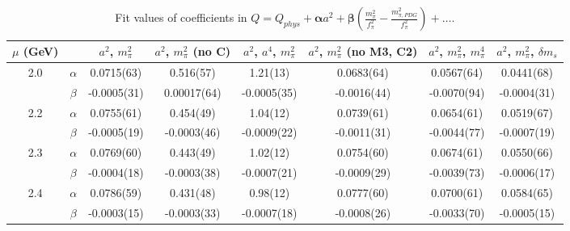 \documentclass[12pt]{extarticle}
\begin{document}
\begin{table}[h!]
\begin{center}
\begin{tabular}{|c c|c|c|c|c|c|c|}
\hline
$\mu$ (GeV) &  & $a^2$, $m_\pi^2$& $a^2$, $m_\pi^2$ (no C)& $a^2$, $a^4$, $m_\pi^2$& $a^2$, $m_\pi^2$ (no M3, C2)& $a^2$, $m_\pi^2$, $m_\pi^4$& $a^2$, $m_\pi^2$, $\delta m_s$\\
\hline
\multirow{2}{0.5in}{2.0} & $\alpha$ & 0.0715(63)& 0.516(57)& 1.21(13)& 0.0683(64)& 0.0567(64)& 0.0441(68)\\
 & $\beta$ & -0.0005(31)& 0.00017(64)& -0.0005(35)& -0.0016(44)& -0.0070(94)& -0.0004(31)\\
\hline
\multirow{2}{0.5in}{2.2} & $\alpha$ & 0.0755(61)& 0.454(49)& 1.04(12)& 0.0739(61)& 0.0654(61)& 0.0519(67)\\
 & $\beta$ & -0.0005(19)& -0.0003(46)& -0.0009(22)& -0.0011(31)& -0.0044(77)& -0.0007(19)\\
\hline
\multirow{2}{0.5in}{2.3} & $\alpha$ & 0.0769(60)& 0.443(49)& 1.02(12)& 0.0754(60)& 0.0674(61)& 0.0550(66)\\
 & $\beta$ & -0.0004(18)& -0.0003(38)& -0.0007(21)& -0.0009(29)& -0.0039(73)& -0.0006(17)\\
\hline
\multirow{2}{0.5in}{2.4} & $\alpha$ & 0.0786(59)& 0.431(48)& 0.98(12)& 0.0777(60)& 0.0700(61)& 0.0584(65)\\
 & $\beta$ & -0.0003(15)& -0.0003(33)& -0.0007(18)& -0.0008(26)& -0.0033(70)& -0.0005(15)\\
\hline
\end{tabular}
\caption{Fit values of coefficients in $Q = Q_{phys} + \mathbf{\alpha} a^2 + \mathbf{\beta}\left(\frac{m_\pi^2}{f_\pi^2}-\frac{m_{\pi,PDG}^2}{f_\pi^2}\right) + \ldots$.}
\end{center}
\end{table}
























\clearpage
\end{document}
